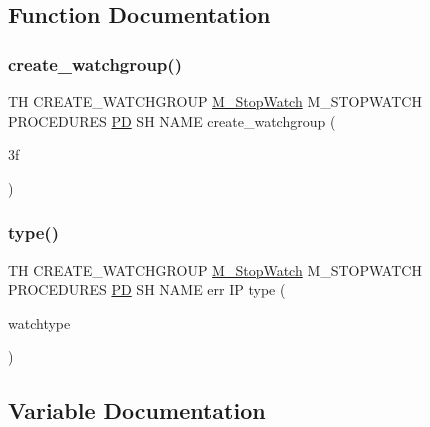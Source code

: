 \subsection{Function Documentation}
\mbox{\label{create__watchgroup_83_8txt_a7e1fab3a0b16096cc31b6750b1a1fa6f}} 
\subsubsection{\texorpdfstring{create\+\_\+watchgroup()}{create\_watchgroup()}}
{\footnotesize\ttfamily TH C\+R\+E\+A\+T\+E\+\_\+\+W\+A\+T\+C\+H\+G\+R\+O\+UP \hyperlink{option__stopwatch_83_8txt_aa2011fc45a5e502e87ee50996a8a9305}{M\+\_\+\+Stop\+Watch} M\+\_\+\+S\+T\+O\+P\+W\+A\+T\+CH P\+R\+O\+C\+E\+D\+U\+R\+ES \hyperlink{what__overview_81_8txt_a85f26da5a4481fbdb0d9c79f2b94de3e}{PD} SH N\+A\+ME create\+\_\+watchgroup (\begin{DoxyParamCaption}\item[{3f}]{ }\end{DoxyParamCaption})}

\mbox{\label{create__watchgroup_83_8txt_adc4024c3b4c8e8b4c2f17a2937352e5d}} 
\subsubsection{\texorpdfstring{type()}{type()}}
{\footnotesize\ttfamily TH C\+R\+E\+A\+T\+E\+\_\+\+W\+A\+T\+C\+H\+G\+R\+O\+UP \hyperlink{option__stopwatch_83_8txt_aa2011fc45a5e502e87ee50996a8a9305}{M\+\_\+\+Stop\+Watch} M\+\_\+\+S\+T\+O\+P\+W\+A\+T\+CH P\+R\+O\+C\+E\+D\+U\+R\+ES \hyperlink{what__overview_81_8txt_a85f26da5a4481fbdb0d9c79f2b94de3e}{PD} SH N\+A\+ME err IP type (\begin{DoxyParamCaption}\item[{watchtype}]{ }\end{DoxyParamCaption})}



\subsection{Variable Documentation}
\mbox{\label{create__watchgroup_83_8txt_a5f82c33d958a5267f1648fdea2152853}} 
